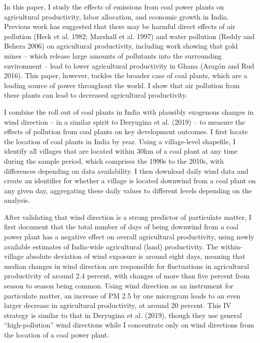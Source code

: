 \documentclass[
]{article}
\begin{document}
In this paper, I study the effects of emissions from coal power plants on agricultural productivity, labor allocation, and economic growth in India. Previous work has suggested that there may be harmful direct effects of air pollution (Heck et al. 1982; Marshall et al. 1997) and water pollution (Reddy and Behera 2006) on agricultural productivity, including work showing that gold mines -- which release large amounts of pollutants into the surrounding environment -- lead to lower agricultural productivity in Ghana (Aragón and Rud 2016). This paper, however, tackles the broader case of coal plants, which are a leading source of power throughout the world. I show that air pollution from these plants can lead to decreased agricultural productivity.

I combine the roll out of coal plants in India with plausibly exogenous changes in wind direction -- in a similar spirit to Deryugina et al. (2019) -- to measure the effects of pollution from coal plants on key development outcomes. I first locate the location of coal plants in India by year. Using a village-level shapefile, I identify all villages that are located within 30km of a coal plant at any time during the sample period, which comprises the 1990s to the 2010s, with differences depending on data availability. I then download daily wind data and create an identifier for whether a village is located downwind from a coal plant on any given day, aggregating these daily values to different levels depending on the analysis.

After validating that wind direction is a strong predictor of particulate matter, I first document that the total number of days of being downwind from a coal power plant has a negative effect on overall agricultural productivity, using newly available estimates of India-wide agricultural (land) productivity. The within-village absolute deviation of wind exposure is around eight days, meaning that median changes in wind direction are responsible for fluctuations in agricultural productivity of around 2.4 percent, with changes of more than five percent from season to season being common. Using wind direction as an instrument for particulate matter, an increase of PM 2.5 by one microgram leads to an even larger decrease in agricultural productivity, at around 20 percent. This IV strategy is similar to that in Deryugina et al. (2019), though they use general ``high-pollution'' wind directions while I concentrate only on wind directions from the location of a coal power plant.
\end{document}
